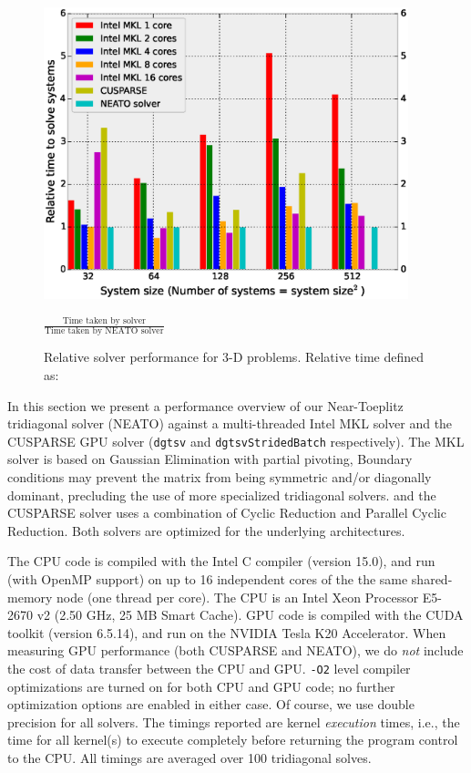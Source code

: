 \documentclass{elsarticle}
\begin{document}
\begin{figure}
\begin{center}
\includegraphics[width=300pt]{fig/bench-3d.eps}
\caption{Relative solver performance for 3-D problems. Relative time defined as:}
$\frac{\text{Time taken by solver}}{\text{Time taken by NEATO solver}}$
\label{fig:bench-3d}
\end{center}
\end{figure}

In this section we present a performance overview
of our Near-Toeplitz tridiagonal solver (NEATO)
against a multi-threaded Intel MKL solver and
the CUSPARSE GPU solver
(\texttt{dgtsv} and \texttt{dgtsvStridedBatch} respectively).
The MKL solver is based on Gaussian Elimination with partial pivoting,
Boundary conditions may prevent
the matrix from being symmetric and/or diagonally dominant,
precluding the use of more specialized tridiagonal solvers.
and the CUSPARSE solver uses a combination of
Cyclic Reduction and Parallel Cyclic Reduction.
Both solvers are optimized for the underlying architectures.

The CPU code is compiled with the Intel C compiler (version 15.0),
and run (with OpenMP support) on up to
16 independent cores of the the same shared-memory node
(one thread per core).
The CPU is an
Intel Xeon Processor E5-2670 v2 (2.50 GHz, 25 MB Smart Cache).
GPU code is compiled with the CUDA toolkit (version 6.5.14),
and run on the
NVIDIA Tesla K20 Accelerator.
When measuring GPU performance (both CUSPARSE and NEATO),
we do \emph{not} include the cost
of data transfer between the CPU and GPU.
\texttt{-O2} level compiler optimizations are turned on for both
CPU and GPU code;
no further optimization options are enabled in either case.
Of course, we use double precision for all solvers.
The timings reported are
kernel \emph{execution} times, i.e.,
the time for all kernel(s) to execute completely
before returning the program control to the CPU.
All timings are averaged over 100 tridiagonal solves.
\end{document}
